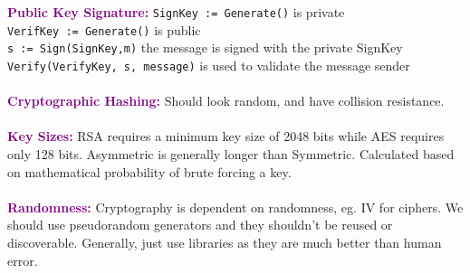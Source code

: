 \documentclass[a4paper,10pt]{article}
\begin{document}
\textcolor{Purple}{\textbf{Public Key Signature:}} 
\texttt{SignKey := Generate()} is private \\
\texttt{VerifKey := Generate()} is public\\
\texttt{s := Sign(SignKey,m)} the message is signed with the private SignKey \\
\texttt{Verify(VerifyKey, s, message)} is used to validate the message sender\\\\
\textcolor{Purple}{\textbf{Cryptographic Hashing:}} Should look random, and have collision resistance. \\\\ 
\textcolor{Purple}{\textbf{Key Sizes:}} RSA requires a minimum key size of 2048 bits while AES requires only 128 bits. Asymmetric is generally longer than Symmetric. Calculated based on mathematical probability of brute forcing a key.\\\\
\textcolor{Purple}{\textbf{Randomness:}} Cryptography is dependent on randomness, eg. IV for ciphers. We should use pseudorandom generators and they shouldn't be reused or discoverable. Generally, just use libraries as they are much better than human error. \\\\
\end{document}

